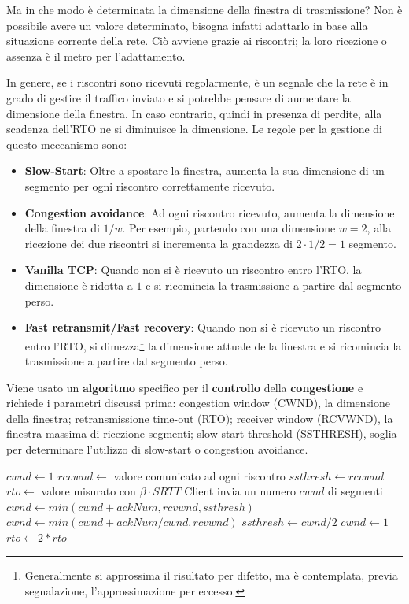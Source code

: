 \noindent Ma in che modo è determinata la dimensione della finestra di trasmissione? Non è possibile avere un valore determinato, bisogna infatti
adattarlo in base alla situazione corrente della rete. Ciò avviene grazie ai riscontri; la loro ricezione o assenza è il metro per l'adattamento.\par
In genere, se i riscontri sono ricevuti regolarmente, è un segnale che la rete è in grado di gestire il traffico inviato e si potrebbe pensare di
aumentare la dimensione della finestra. In caso contrario, quindi in presenza di perdite, alla scadenza dell'RTO ne si diminuisce la dimensione.
Le regole per la gestione di questo meccanismo sono: \begin{itemize}
	\item \textbf{Slow-Start}: Oltre a spostare la finestra, aumenta la sua dimensione di un segmento per ogni riscontro correttamente ricevuto.
	\item \textbf{Congestion avoidance}: Ad ogni riscontro ricevuto, aumenta la dimensione della finestra di $1/w$. Per esempio, partendo con una
	dimensione $w=2$, alla ricezione dei due riscontri si incrementa la grandezza di $2\cdot 1/2 = 1$ segmento. 
	\item \textbf{Vanilla TCP}: Quando non si è ricevuto un riscontro entro l'RTO, la dimensione è ridotta a $1$ e si ricomincia la trasmissione a
	partire dal segmento perso.
	\item \textbf{Fast retransmit/Fast recovery}: Quando non si è ricevuto un riscontro entro l'RTO, si dimezza\footnote{Generalmente si approssima
	il risultato per difetto, ma è contemplata, previa segnalazione, l'approssimazione per eccesso.} la dimensione attuale della finestra
	e si ricomincia la trasmissione a partire dal segmento perso.
\end{itemize}

\noindent Viene usato un \textbf{algoritmo} specifico per il \textbf{controllo} della \textbf{congestione} e richiede i parametri discussi prima:
congestion window (CWND), la dimensione della finestra; retransmissione time-out (RTO); receiver window (RCVWND), la finestra massima di ricezione
segmenti; slow-start threshold (SSTHRESH), soglia per determinare l'utilizzo di slow-start o congestion avoidance.
\begin{algorithm}
	\caption{TCP-WindowManager()}
	\begin{algorithmic}[i]
		\State $cwnd\gets 1$
		\State $rcvwnd\gets$ valore comunicato ad ogni riscontro
		\State $ssthresh\gets rcvwnd$
		\State $rto\gets$ valore misurato con $\beta\cdot SRTT$
		\State
		\State Client invia un numero $cwnd$ di segmenti
		 
		\State $cwnd\gets min(cwnd + ackNum, rcvwnd, ssthresh)$
		\Else {}
		\State $cwnd\gets min(cwnd+ackNum / cwnd, rcvwnd)$
		\EndIf
		\Else {}
		\State $ssthresh\gets cwnd/2$
		\State $cwnd\gets 1$ 
		\State $rto\gets 2*rto$
		\EndIf
	\end{algorithmic}
\end{algorithm}

